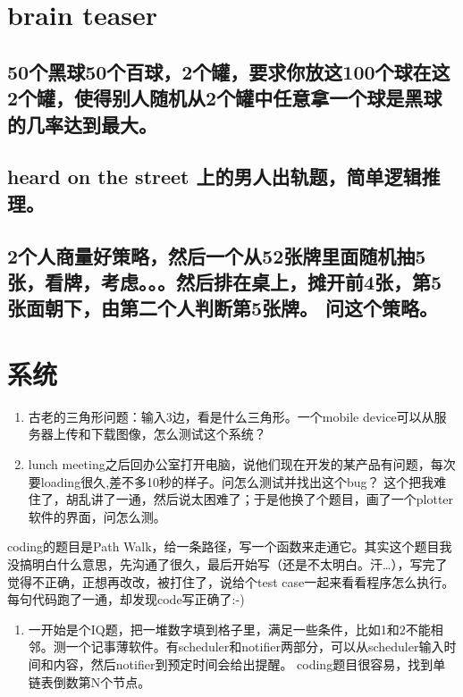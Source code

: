 \documentclass[12pt]{book}
\begin{document}
\chapter{brain teaser}
\label{sec-8}
\section{50个黑球50个百球，2个罐，要求你放这100个球在这2个罐，使得别人随机从2个罐中任意拿一个球是黑球的几率达到最大。}
\label{sec-8-1}

\section{heard on the street 上的男人出轨题，简单逻辑推理。}
\label{sec-8-2}

\section{2个人商量好策略，然后一个从52张牌里面随机抽5张，看牌，考虑。。。然后排在桌上，摊开前4张，第5张面朝下，由第二个人判断第5张牌。 问这个策略。}
\label{sec-8-3}

\chapter{系统}
\label{sec-9}
\begin{enumerate}
\item 古老的三角形问题：输入3边，看是什么三角形。一个mobile device可以从服务器上传和下载图像，怎么测试这个系统？

\item lunch meeting之后回办公室打开电脑，说他们现在开发的某产品有问题，每次要loading很久,差不多10秒的样子。问怎么测试并找出这个bug？ 这个把我难住了，胡乱讲了一通，然后说太困难了；于是他换了个题目，画了一个plotter软件的界面，问怎么测。
\end{enumerate}
coding的题目是Path Walk，给一条路径，写一个函数来走通它。其实这个题目我没搞明白什么意思，先沟通了很久，最后开始写（还是不太明白。汗\ldots{}），写完了觉得不正确，正想再改改，被打住了，说给个test case一起来看看程序怎么执行。每句代码跑了一通，却发现code写正确了:-) 

\begin{enumerate}
\item 一开始是个IQ题，把一堆数字填到格子里，满足一些条件，比如1和2不能相邻。测一个记事薄软件。有scheduler和notifier两部分，可以从scheduler输入时间和内容，然后notifier到预定时间会给出提醒。 coding题目很容易，找到单链表倒数第N个节点。
\end{enumerate}
\end{document}
